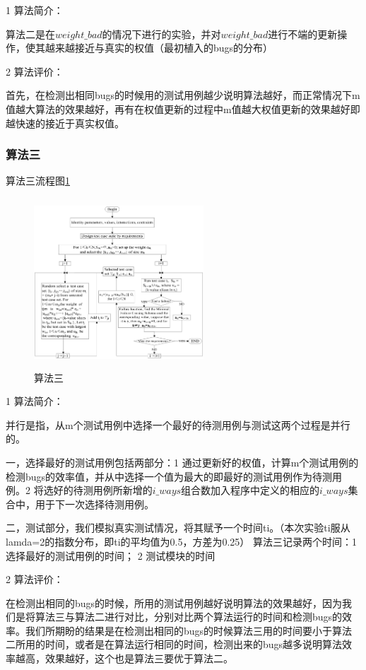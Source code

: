 \documentclass[10pt,journal,letterpaper,compsoc]{IEEEtran}
\begin{document}
\begin{CJK}{UTF8}{gkai}
1 算法简介：

   算法二是在$weight\_bad$的情况下进行的实验，并对$weight\_bad$进行不端的更新操作，使其越来越接近与真实的权值（最初植入的bugs的分布）
   
2 算法评价：

   首先，在检测出相同bugs的时候用的测试用例越少说明算法越好，而正常情况下m值越大算法的效果越好，再有在权值更新的过程中m值越大权值更新的效果越好即越快速的接近于真实权值。
	\subsubsection{算法三}

算法三流程图\ref{fig:ARCH}
 \begin{figure}[htb]
   \centering
   \includegraphics[width=2.5in,height=2.5in]{./CT/CT3.eps}
   \caption{算法三}
   \label{fig:ARCH}
 \end{figure}

1 算法简介：

   并行是指，从m个测试用例中选择一个最好的待测用例与测试这两个过程是并行的。
   
   一，选择最好的测试用例包括两部分：1 通过更新好的权值，计算m个测试用例的检测bugs的效率值，并从中选择一个值为最大的即最好的测试用例作为待测用例。2 将选好的待测用例所新增的$i\_ways$组合数加入程序中定义的相应的$i\_ways$集合中，用于下一次选择待测用例。
   
   二，测试部分，我们模拟真实测试情况，将其赋予一个时间ti。（本次实验ti服从lamda=2的指数分布，即ti的平均值为0.5，方差为0.25）
算法三记录两个时间：1 选择最好的测试用例的时间； 2 测试模块的时间

2 算法评价：

   在检测出相同的bugs的时候，所用的测试用例越好说明算法的效果越好，因为我们是将算法三与算法二进行对比，分别对比两个算法运行的时间和检测bugs的效率。我们所期盼的结果是在检测出相同的bugs的时候算法三用的时间要小于算法二所用的时间，或者是在算法运行相同的时间，检测出来的bugs越多说明算法效率越高，效果越好，这个也是算法三要优于算法二。

\end{CJK}
\end{document}
